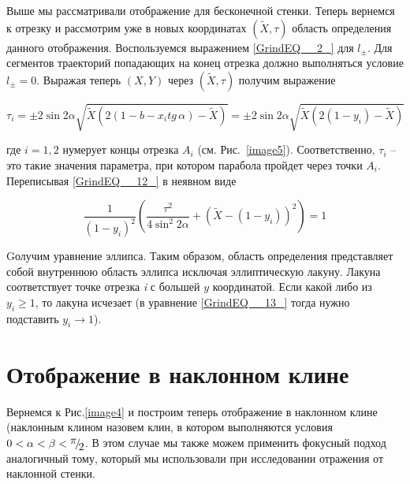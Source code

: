 \documentclass[a4paper]{article}
\begin{document}
 Выше мы рассматривали отображение для бесконечной стенки. Теперь вернемся к отрезку и рассмотрим уже в новых координатах $\left(\tilde{X},\tau \right)$ область определения данного отображения. Воспользуемся выражением \eqref{GrindEQ__2_} для $l_{\pm } $. Для сегментов траекторий попадающих на конец отрезка должно выполняться условие $l_{\pm } =0$. Выражая теперь $\left(X,Y\right)$ через $\left(\tilde{X},\tau \right)$ получим выражение

\begin{equation} \label{GrindEQ__12_} \tau _{i} =\pm 2\sin 2\alpha \sqrt{\tilde{X}\left(2\left(1-b-x_{i} tg\, \alpha \right)-\tilde{X}\right)} =\pm 2\sin 2\alpha \sqrt{\tilde{X}\left(2\left(1-y_{i} \right)-\tilde{X}\right)}  \end{equation}

где $i=1,2$ нумерует концы отрезка $A_{i} $ (см. Рис.~\ref{image5}). Соответственно, $\tau _{i} $ -- это такие значения параметра, при котором парабола пройдет через точки $A_{i} $. Переписывая \eqref{GrindEQ__12_} в неявном виде

\begin{equation} \label{GrindEQ__13_} \frac{1}{\left(1-y_{i} \right)^{2} } \left(\frac{\tau ^{2} }{4\sin ^{2} 2\alpha } +\left(\tilde{X}-\left(1-y_{i} \right)\right)^{2} \right)=1 \end{equation}

Gолучим уравнение эллипса. 
Таким образом, область определения представляет собой внутреннюю область эллипса исключая эллиптическую лакуну. Лакуна соответствует точке отрезка \textit{i} с большей $y$ координатой. Если какой либо из $y_{i} \ge 1$, то лакуна исчезает (в уравнение \eqref{GrindEQ__13_} тогда нужно подставить $y_{i} \to 1$).

\section{ Отображение в наклонном клине}

Вернемся к Рис.\ref{image4} и построим теперь отображение в наклонном клине (наклонным клином назовем клин, в котором выполняются условия $0<\alpha <\beta <{\raise0.7ex\hbox{$ \pi  $}\!\mathord{\left/ {\vphantom {\pi  2}} \right. \kern-\nulldelimiterspace}\!\lower0.7ex\hbox{$ 2 $}} $. В этом случае мы также можем применить фокусный подход аналогичный тому, который мы использовали при исследовании отражения от наклонной стенки.
\end{document}
